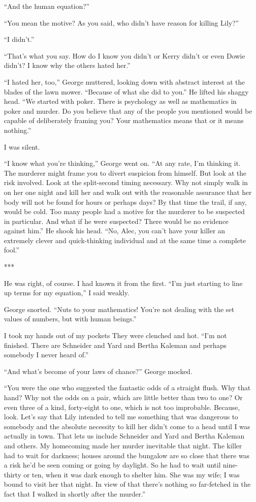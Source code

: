 \documentclass{novel}
\begin{document}
{“And the human equation?”

“You mean the motive? As you said, who didn’t have reason for killing Lily?”

“I didn’t.”

“That’s what you say. How do I know you didn’t or Kerry didn’t or even Dowie didn’t? I know why the others hated her.”

“I hated her, too,” George muttered, looking down with abstract interest at the blades of the lawn mower. “Because of what she did to you.” He lifted his shaggy head. “We started with poker. There is psychology as well as mathematics in poker and murder. Do you believe that any of the people you mentioned would be capable of deliberately framing you? Your mathematics means that or it means nothing.”

I was silent.

“I know what you’re thinking,” George went on. “At any rate, I’m thinking it. The murderer might frame you to divert suspicion from himself. But look at the risk involved. Look at the split-second timing necessary. Why not simply walk in on her one night and kill her and walk out with the reasonable assurance that her body will not be found for hours or perhaps days? By that time the trail, if any, would be cold. Too many people had a motive for the murderer to be suspected in particular. And what if he were suspected? There would be no evidence against him.” He shook his head. “No, Alec, you can’t have your killer an extremely clever and quick-thinking individual and at the same time a complete fool.”

***

He was right, of course. I had known it from the first. “I’m just starting to line up terms for my equation,” I said weakly.

George snorted. “Nuts to your mathematics! You’re not dealing with the set values of numbers, but with human beings.”

I took my hands out of my pockets They were clenched and hot. “I’m not finished. There are Schneider and Yard and Bertha Kaleman and perhaps somebody I never heard of.”

“And what’s become of your laws of chance?” George mocked.

“You were the one who suggested the fantastic odds of a straight flush. Why that hand? Why not the odds on a pair, which are little better than two to one? Or even three of a kind, forty-eight to one, which is not too improbable. Because, look. Let’s say that Lily intended to tell me something that was dangerous to somebody and the absolute necessity to kill her didn’t come to a head until I was actually in town. That lets us include Schneider and Yard and Bertha Kaleman and others. My homecoming made her murder inevitable that night. The killer had to wait for darkness; houses around the bungalow are so close that there was a risk he’d be seen coming or going by daylight. So he had to wait until nine-thirty or ten, when it was dark enough to shelter him. She was my wife; I was bound to visit her that night. In view of that there’s nothing so far-fetched in the fact that I walked in shortly after the murder.”

}
\end{document}
